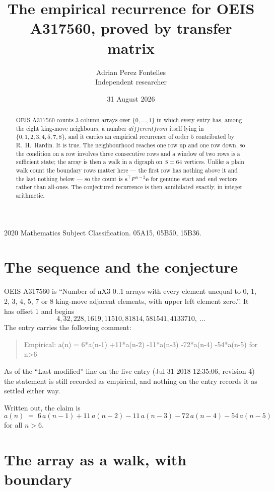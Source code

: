 \documentclass[11pt,a4paper]{article}
\title{The empirical recurrence for OEIS A317560, proved by transfer matrix}
\author{Adrian Perez Fontelles\\ \small Independent researcher}
\date{31 August 2026}
\theoremstyle{plain}
\theoremstyle{definition}
\begin{document}
\maketitle

\begin{abstract}
OEIS A317560 counts $3$-column arrays over $\{0,\dots,1\}$ in which every entry has,
among the eight king-move neighbours, a number $different from$ itself lying in $\{0,1,2,3,4,5,7,8\}$, and it carries an empirical
recurrence of order $5$ contributed by R.~H.~Hardin. It is true. The neighbourhood
reaches one row up and one row down, so the condition on a row involves three consecutive
rows and a window of two rows is a sufficient state; the array is then a walk in a digraph
on $S=64$ vertices. Unlike a plain walk count the boundary rows matter here --- the first
row has nothing above it and the last nothing below --- so the count is
$\mathbf{s}^{\!\top}P^{\,n-2}\mathbf{e}$ for genuine start and end vectors rather than
all-ones. The conjectured recurrence is then annihilated exactly, in integer arithmetic.
\end{abstract}

\noindent\small 2020 Mathematics Subject Classification. 05A15, 05B50, 15B36.\normalsize

\section{The sequence and the conjecture}

OEIS A317560 is ``Number of nX3 0..1 arrays with every element unequal to 0, 1, 2, 3, 4, 5, 7 or 8 king-move adjacent elements, with upper left element zero.''. It has offset
$1$ and begins
\[
4, 32, 228, 1619, 11510, 81814, 581541, 4133710,\ \dots
\]
The entry carries the following comment:
\begin{quote}\small
Empirical: a(n) = 6*a(n-1) +11*a(n-2) -11*a(n-3) -72*a(n-4) -54*a(n-5) for n>6
\end{quote}
As of the ``Last modified'' line on the live entry (Jul 31 2018 12:35:06, revision
4) the statement is still recorded as empirical, and nothing on the entry
records it as settled either way.

Written out, the claim is
\begin{equation}\label{eq:conj}
a(n)\;=\;6\,a(n-1) + 11\,a(n-2) - 11\,a(n-3) - 72\,a(n-4) - 54\,a(n-5)
\end{equation}
for all $n>6$.

\section{The array as a walk, with boundary}
\end{document}

